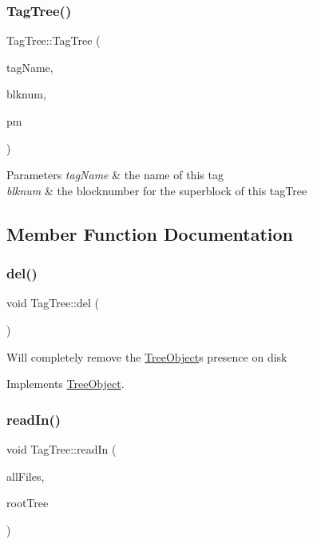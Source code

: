 \subsubsection{\texorpdfstring{Tag\+Tree()}{TagTree()}}
{\footnotesize\ttfamily Tag\+Tree\+::\+Tag\+Tree (\begin{DoxyParamCaption}\item[{string}]{tag\+Name,  }\item[{Blk\+Num\+Type}]{blknum,  }\item[{\mbox{\hyperlink{classPartitionManager}{Partition\+Manager}} $\ast$}]{pm }\end{DoxyParamCaption})}


\begin{DoxyParams}{Parameters}
{\em tag\+Name} & the name of this tag \\
\hline
{\em blknum} & the blocknumber for the superblock of this tag\+Tree \\
\hline
\end{DoxyParams}


\subsection{Member Function Documentation}
\mbox{\label{classTagTree_ad8108969f4d28b938e55c8339f19db35}} 
\subsubsection{\texorpdfstring{del()}{del()}}
{\footnotesize\ttfamily void Tag\+Tree\+::del (\begin{DoxyParamCaption}{ }\end{DoxyParamCaption})\hspace{0.3cm}{\ttfamily [virtual]}}

Will completely remove the \mbox{\hyperlink{classTreeObject}{Tree\+Object}}\textquotesingle{}s presence on disk 

Implements \mbox{\hyperlink{classTreeObject_af390b7479aa972888e594c07a85740b6}{Tree\+Object}}.

\mbox{\label{classTagTree_a2e72921ccc19667331c64d3d0100b269}} 
\subsubsection{\texorpdfstring{read\+In()}{readIn()}}
{\footnotesize\ttfamily void Tag\+Tree\+::read\+In (\begin{DoxyParamCaption}\item[{unordered\+\_\+multimap$<$ string, \mbox{\hyperlink{classFileInfo}{File\+Info}} $\ast$$>$ $\ast$}]{all\+Files,  }\item[{\mbox{\hyperlink{classRootTree}{Root\+Tree}} $\ast$}]{root\+Tree }\end{DoxyParamCaption})\hspace{0.3cm}{\ttfamily [virtual]}}

